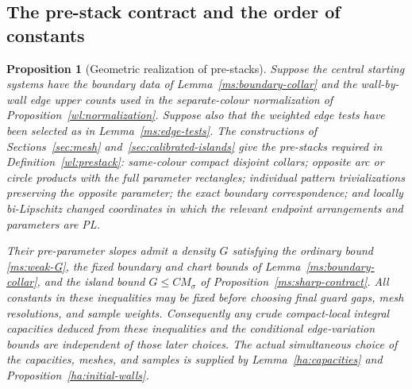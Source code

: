 \documentclass[11pt]{article}
\numberwithin{equation}{section}
\newtheorem{proposition}[theorem]{Proposition}
\theoremstyle{definition}
\theoremstyle{remark}
\begin{document}
\subsection{The pre-stack contract and the order of constants}

\begin{proposition}[Geometric realization of pre-stacks]
\label{ms:prestacks}
Suppose the central starting systems have the boundary data of
Lemma~\ref{ms:boundary-collar} and the wall-by-wall edge upper counts
used in the separate-colour normalization of
Proposition~\ref{wl:normalization}.  Suppose also that the weighted edge tests
have been selected as in Lemma~\ref{ms:edge-tests}.  The constructions
of Sections~\ref{sec:mesh} and~\ref{sec:calibrated-islands} give the
pre-stacks required in
Definition~\ref{wl:prestack}: same-colour compact disjoint collars; opposite
arc or circle products with the full parameter rectangles;
individual pattern trivializations preserving the opposite
parameter; the exact boundary correspondence; and locally
bi-Lipschitz changed coordinates in which the relevant endpoint
arrangements and parameters are PL.

Their pre-parameter slopes admit a density $G$ satisfying the
ordinary bound \eqref{ms:weak-G}, the fixed boundary and chart
bounds of Lemma~\ref{ms:boundary-collar}, and the island bound
$G\le CM_\sigma$ of Proposition~\ref{ms:sharp-contract}.  All constants in
these inequalities may be fixed before choosing final guard
gaps, mesh resolutions, and sample weights.  Consequently any
crude compact-local integral capacities deduced from these
inequalities and the conditional edge-variation bounds are
independent of those later choices.  The actual simultaneous
choice of the capacities, meshes, and samples is supplied by
Lemma~\ref{ha:capacities} and Proposition~\ref{ha:initial-walls}.
\end{proposition}
\end{document}
